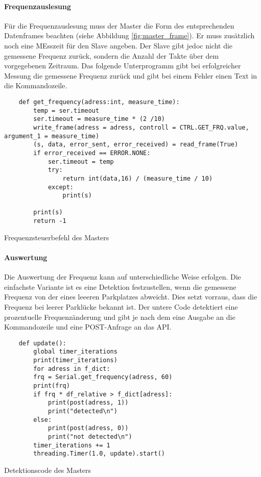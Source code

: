 \paragraph{Frequenzauslesung}\mbox{} 

Für die Frequenzauslesung muss der Master die Form des entsprechenden Datenframes beachten (siehe Abbildung \ref{fig:master_frame}). Er muss zusätzlich noch eine MEsszeit für den Slave angeben. Der Slave gibt jedoc nicht die gemessene
Frequenz zurück, sondern die Anzahl der Takte über dem vorgegebenen Zeitraum. Das folgende Unterprogramm gibt bei erfolgreicher Messung die gemessene Frequenz zurück und gibt bei einem Fehler einen Text in die Kommandozeile.


\begin{listing}[H]
    \begin{verbatim}
    def get_frequency(adress:int, measure_time):
        temp = ser.timeout
        ser.timeout = measure_time * (2 /10)
        write_frame(adress = adress, controll = CTRL.GET_FRQ.value, argument_1 = measure_time)
        (s, data, error_sent, error_received) = read_frame(True)
        if error_received == ERROR.NONE:
            ser.timeout = temp
            try:
                return int(data,16) / (measure_time / 10)
            except:
                print(s)

        print(s)
        return -1
    \end{verbatim}
    \caption{Frequenzsteuerbefehl des Masters}
\end{listing}
\paragraph{Auswertung}\mbox{} 

Die Auswertung der Frequenz kann auf unterschiedliche Weise erfolgen. Die einfachste Variante ist es eine Detektion festzustellen, wenn die gemessene Frequenz von der eines leeeren Parkplatzes abweicht. Dies setzt vorraus, dass die Frequenz bei leerer 
Parklücke bekannt ist. Der untere Code detektiert eine prozentuelle Frequenzänderung und gibt je nach dem eine Ausgabe an die Kommandozeile und eine POST-Anfrage an das API.

\begin{listing}[H]
    \begin{verbatim}
    def update():
        global timer_iterations
        print(timer_iterations)
        for adress in f_dict:
        frq = Serial.get_frequency(adress, 60)
        print(frq)
        if frq * df_relative > f_dict[adress]:
            print(post(adress, 1))
            print("detected\n")
        else:
            print(post(adress, 0))
            print("not detected\n")
        timer_iterations += 1
        threading.Timer(1.0, update).start()
    \end{verbatim}
    \caption{Detektionscode des Masters}
\end{listing}


